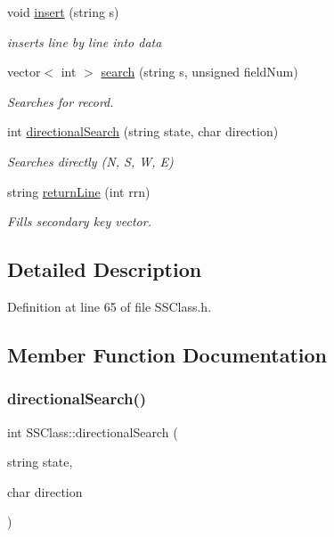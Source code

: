 \begin{DoxyCompactItemize}
void \hyperlink{classSSClass_a45c5585c784bf7c4f823f66426664aea}{insert} (string s)
\begin{DoxyCompactList}\small\item\em inserts line by line into data \end{DoxyCompactList}\item 
vector$<$ int $>$ \hyperlink{classSSClass_a9df3598c000a6a5e9ef994d19196e69f}{search} (string s, unsigned field\+Num)
\begin{DoxyCompactList}\small\item\em Searches for record. \end{DoxyCompactList}\item 
int \hyperlink{classSSClass_ad03c99840c2946a2112f5f1942c287f2}{directional\+Search} (string state, char direction)
\begin{DoxyCompactList}\small\item\em Searches directly (N, S, W, E) \end{DoxyCompactList}\item 
string \hyperlink{classSSClass_ab0a8ea1af895df28359b5733bd920ef3}{return\+Line} (int rrn)
\begin{DoxyCompactList}\small\item\em Fills secondary key vector. \end{DoxyCompactList}\end{DoxyCompactItemize}


\subsection{Detailed Description}


Definition at line 65 of file S\+S\+Class.\+h.



\subsection{Member Function Documentation}
\mbox{\label{classSSClass_ad03c99840c2946a2112f5f1942c287f2}} 
\subsubsection{\texorpdfstring{directional\+Search()}{directionalSearch()}}
{\footnotesize\ttfamily int S\+S\+Class\+::directional\+Search (\begin{DoxyParamCaption}\item[{string}]{state,  }\item[{char}]{direction }\end{DoxyParamCaption})}



